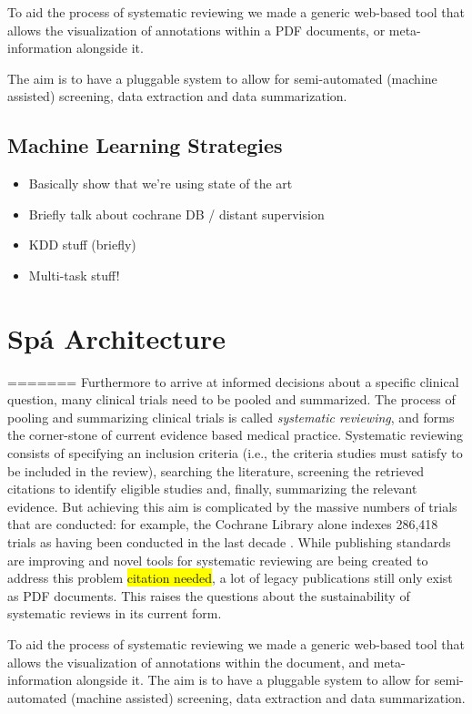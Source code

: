 \documentclass[runningheads,a4paper]{llncs}
\newcommand{\highlight}[1]{\colorbox{yellow}{#1}}
\begin{document}
To aid the process of systematic reviewing we made a generic web-based tool that allows the visualization of annotations within a PDF documents, or meta-information alongside it.

The aim is to have a pluggable system to allow for semi-automated (machine assisted) screening, data extraction and data summarization.

\subsection{Machine Learning Strategies}

\begin{itemize}
\item Basically show that we're using state of the art
\item Briefly talk about cochrane DB / distant supervision
\item KDD stuff (briefly)
\item Multi-task stuff!
\end{itemize}

\section{Sp{\'a} Architecture}
\label{section:architecture}

=======
Furthermore to arrive at informed decisions about a specific clinical question, many clinical trials need to be pooled and summarized.
The process of pooling and summarizing clinical trials is called \emph{systematic reviewing}, and forms the corner-stone of current evidence based medical practice.
Systematic reviewing consists of specifying an inclusion criteria (i.e., the criteria studies must satisfy to be included in the review), searching the literature, screening the retrieved citations to identify eligible studies and, finally, summarizing the relevant evidence.
But achieving this aim is complicated by the massive numbers of trials that are conducted: for example, the Cochrane Library alone indexes 286,418 trials as having been conducted in the last decade \cite{valkenhoef2012}.
While publishing standards are improving and novel tools for systematic reviewing are being created to address this problem \highlight{citation needed}, a lot of legacy publications still only exist as PDF documents.
This raises the questions about the sustainability of systematic reviews in its current form.

To aid the process of systematic reviewing we made a generic web-based tool that allows the visualization of annotations within the document, and meta-information alongside it.
The aim is to have a pluggable system to allow for semi-automated (machine assisted) screening, data extraction and data summarization.
\end{document}
